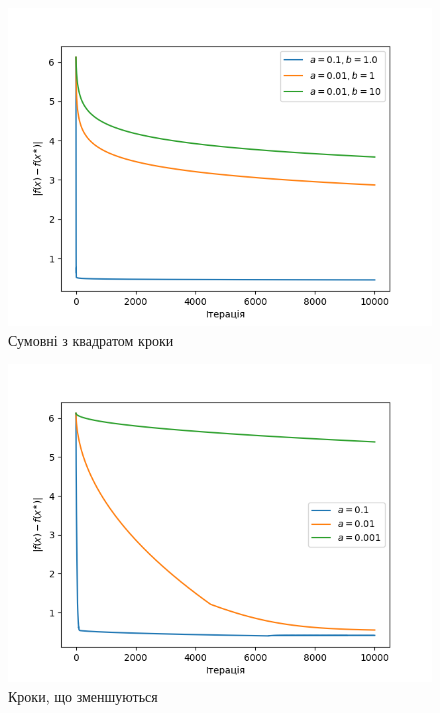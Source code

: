 \documentclass[a4paper, 14pt]{extarticle}
\begin{document}
\begin{figure}[h]
    \centering
    \caption{Сумовні з квадратом кроки}
    \includegraphics{square_summable.png}
\end{figure}
\begin{figure}[h]
    \centering
    \caption{Кроки, що зменшуються}
    \includegraphics{diminishing.png}
\end{figure}
\end{document}
